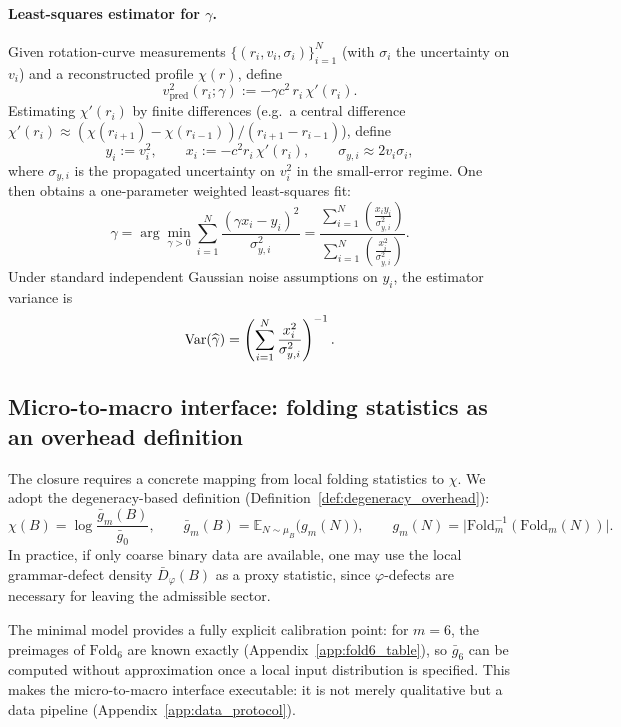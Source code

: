 \paragraph{Least-squares estimator for $\gamma$.}
Given rotation-curve measurements $\{(r_i,v_i,\sigma_i)\}_{i=1}^N$ (with $\sigma_i$ the uncertainty on $v_i$) and a reconstructed profile $\chi(r)$, define
\[
v_{\mathrm{pred}}^2(r_i;\gamma):=-\gamma c^2\, r_i\,\chi'(r_i).
\]
Estimating $\chi'(r_i)$ by finite differences (e.g.\ a central difference $\chi'(r_i)\approx(\chi(r_{i+1})-\chi(r_{i-1}))/(r_{i+1}-r_{i-1})$), define
\[
y_i:=v_i^2,
\qquad
x_i:=-c^2 r_i\,\chi'(r_i),
\qquad
\sigma_{y,i}\approx 2v_i\sigma_i,
\]
where $\sigma_{y,i}$ is the propagated uncertainty on $v_i^2$ in the small-error regime.
One then obtains a one-parameter weighted least-squares fit:
\[
\widehat{\gamma}=\arg\min_{\gamma>0}\sum_{i=1}^N \frac{(\gamma x_i-y_i)^2}{\sigma_{y,i}^2}
=\frac{\sum_{i=1}^N \left(\frac{x_i y_i}{\sigma_{y,i}^2}\right)}{\sum_{i=1}^N \left(\frac{x_i^2}{\sigma_{y,i}^2}\right)}.
\]
Under standard independent Gaussian noise assumptions on $y_i$, the estimator variance is
\[
\mathrm{Var}(\widehat{\gamma})=\left(\sum_{i=1}^N \frac{x_i^2}{\sigma_{y,i}^2}\right)^{-1}.
\]

\subsection{Micro-to-macro interface: folding statistics as an overhead definition}
\label{subsec:micro_to_macro}

The closure requires a concrete mapping from local folding statistics to $\chi$.
We adopt the degeneracy-based definition (Definition~\ref{def:degeneracy_overhead}):
\[
\chi(B)=\log\frac{\bar{g}_m(B)}{\bar{g}_0},
\qquad
\bar{g}_m(B)=\mathbb{E}_{N\sim\mu_B}\bigl(g_m(N)\bigr),
\qquad
g_m(N)=\bigl|\mathrm{Fold}_m^{-1}(\mathrm{Fold}_m(N))\bigr|.
\]
In practice, if only coarse binary data are available, one may use the local grammar-defect density $\bar{D}_\varphi(B)$ as a proxy statistic, since $\varphi$-defects are necessary for leaving the admissible sector.

The minimal model provides a fully explicit calibration point: for $m=6$, the preimages of $\mathrm{Fold}_6$ are known exactly (Appendix~\ref{app:fold6_table}), so $\bar{g}_6$ can be computed without approximation once a local input distribution is specified.
This makes the micro-to-macro interface executable: it is not merely qualitative but a data pipeline (Appendix~\ref{app:data_protocol}).



